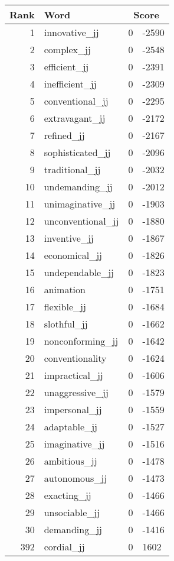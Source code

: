 \begin{longtable}[!htbp]{| rlr@{.}l |}
    \hline
    \textbf{Rank} & \textbf{Word} & \multicolumn{2}{c|}{\textbf{Score}} \\
    \hline
    \endhead
    1 & innovative\_jj & 0 & -2590 \\
    2 & complex\_jj & 0 & -2548 \\
    3 & efficient\_jj & 0 & -2391 \\
    4 & inefficient\_jj & 0 & -2309 \\
    5 & conventional\_jj & 0 & -2295 \\
    6 & extravagant\_jj & 0 & -2172 \\
    7 & refined\_jj & 0 & -2167 \\
    8 & sophisticated\_jj & 0 & -2096 \\
    9 & traditional\_jj & 0 & -2032 \\
    10 & undemanding\_jj & 0 & -2012 \\
    11 & unimaginative\_jj & 0 & -1903 \\
    12 & unconventional\_jj & 0 & -1880 \\
    13 & inventive\_jj & 0 & -1867 \\
    14 & economical\_jj & 0 & -1826 \\
    15 & undependable\_jj & 0 & -1823 \\
    16 & animation & 0 & -1751 \\
    17 & flexible\_jj & 0 & -1684 \\
    18 & slothful\_jj & 0 & -1662 \\
    19 & nonconforming\_jj & 0 & -1642 \\
    20 & conventionality & 0 & -1624 \\
    21 & impractical\_jj & 0 & -1606 \\
    22 & unaggressive\_jj & 0 & -1579 \\
    23 & impersonal\_jj & 0 & -1559 \\
    24 & adaptable\_jj & 0 & -1527 \\
    25 & imaginative\_jj & 0 & -1516 \\
    26 & ambitious\_jj & 0 & -1478 \\
    27 & autonomous\_jj & 0 & -1473 \\
    28 & exacting\_jj & 0 & -1466 \\
    29 & unsociable\_jj & 0 & -1466 \\
    30 & demanding\_jj & 0 & -1416 \\
    392 & cordial\_jj & 0 & 1602 \\

\end{longtable}
